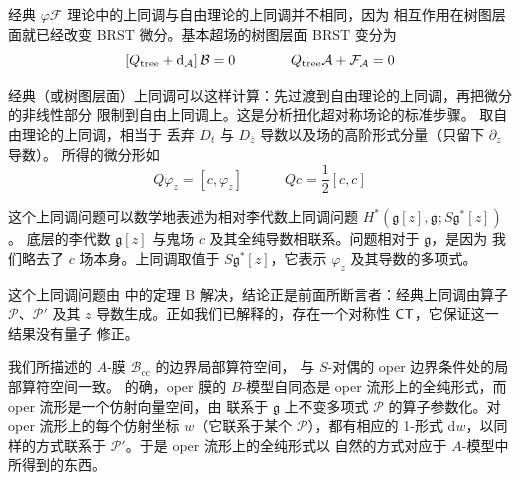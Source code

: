经典 $\varphi \mathcal F$ 理论中的上同调与自由理论的上同调并不相同，因为
相互作用在树图层面就已经改变 BRST 微分。基本超场的树图层面 BRST 变分为
\begin{equation}
\left[Q_{\mathrm{tree}} + \mathrm{d}_{\cal A} \right] {\cal B} = 0 \qquad \qquad Q_{\mathrm{tree}} {\cal A} + {\cal F}_{\cal A} = 0
\end{equation}

经典（或树图层面）上同调可以这样计算：先过渡到自由理论的上同调，再把微分的非线性部分
限制到自由上同调上。这是分析扭化超对称场论的标准步骤。
取自由理论的上同调，相当于
丢弃 $D_t$ 与 $D_{\bar z}$ 导数以及场的高阶形式分量（只留下 $\partial_z$ 导数）。
所得的微分形如
\begin{equation}
Q \varphi_z = [c,\varphi_z] \quad \qquad Q c = \frac12 [c,c]
\end{equation}

这个上同调问题可以数学地表述为相对李代数上同调问题 $H^*(\mathfrak{g}[z],\mathfrak{g};S \mathfrak{g}^*[z])$。
底层的李代数 $\mathfrak{g}[z]$ 与鬼场 $c$ 及其全纯导数相联系。问题相对于 $\mathfrak{g}$，是因为
我们略去了 $c$ 场本身。上同调取值于 $S \mathfrak{g}^*[z]$，它表示 $\varphi_z$ 及其导数的多项式。

这个上同调问题由 \cite{FGT} 中的定理 B 解决，结论正是前面所断言者：经典上同调由算子
$\mathcal P$、$\mathcal P'$ 及其 $z$ 导数生成。正如我们已解释的，存在一个对称性 $\sf {CT}$，它保证这一结果没有量子
修正。


我们所描述的 $A$-膜 $\mathcal B_{\mathrm{cc}}$ 的边界局部算符空间，
与 $S$-对偶的 oper 边界条件处的局部算符空间一致。
的确，oper 膜的 $B$-模型自同态是 oper 流形上的全纯形式，而 oper 流形是一个仿射向量空间，由
联系于 $\mathfrak g$ 上不变多项式 $\mathcal P$ 的算子参数化。对 oper 流形上的每个仿射坐标 $w$（它联系于某个
$\mathcal P$），都有相应的 1-形式 ${\mathrm d} w$，以同样的方式联系于 $\mathcal P'$。于是 oper 流形上的全纯形式以
自然的方式对应于 $A$-模型中所得到的东西。
